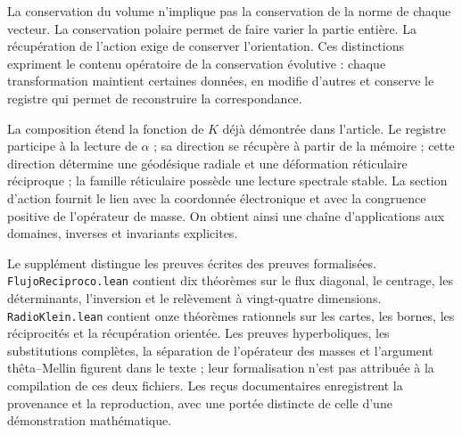 La conservation du volume n'implique pas la conservation de la norme de chaque vecteur. La conservation polaire permet de faire varier la partie entière. La récupération de l'action exige de conserver l'orientation. Ces distinctions expriment le contenu opératoire de la conservation évolutive : chaque transformation maintient certaines données, en modifie d'autres et conserve le registre qui permet de reconstruire la correspondance.

La composition étend la fonction de \(K\) déjà démontrée dans l’article. Le registre participe à la lecture de \(\alpha\) ; sa direction se récupère à partir de la mémoire ; cette direction détermine une géodésique radiale et une déformation réticulaire réciproque ; la famille réticulaire possède une lecture spectrale stable. La section d’action fournit le lien avec la coordonnée électronique et avec la congruence positive de l’opérateur de masse. On obtient ainsi une chaîne d’applications aux domaines, inverses et invariants explicites.


Le supplément distingue les preuves écrites des preuves formalisées. \texttt{FlujoReciproco.lean} contient dix théorèmes sur le flux diagonal, le centrage, les déterminants, l’inversion et le relèvement à vingt-quatre dimensions. \texttt{RadioKlein.lean} contient onze théorèmes rationnels sur les cartes, les bornes, les réciprocités et la récupération orientée. Les preuves hyperboliques, les substitutions complètes, la séparation de l’opérateur des masses et l’argument thêta--Mellin figurent dans le texte ; leur formalisation n’est pas attribuée à la compilation de ces deux fichiers. Les reçus documentaires enregistrent la provenance et la reproduction, avec une portée distincte de celle d’une démonstration mathématique.
